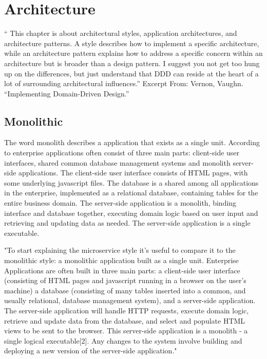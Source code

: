 \chapter{Architecture}
\label{ch:architecture}

“ This chapter is about architectural styles, application architectures, and architecture patterns. A style describes how to implement a specific architecture, while an architecture pattern explains how to address a specific concern within an architecture but is broader than a design pattern. I suggest you not get too hung up on the differences, but just understand that DDD can reside at the heart of a lot of surrounding architectural influences.”
Excerpt From: Vernon, Vaughn. “Implementing Domain-Driven Design.”


\section{Monolithic}
The word monolith describes a application that exists as a single unit. According to \citeauthor{fowler2014microservices} enterprise applications often consist of three main parts: client-side user interfaces, shared common database management systems and monolith server-side applications. The client-side user interface consists of HTML pages, with some underlying javascript files. The database is a shared among all applications in the enterprise, implemented as a relational database, containing tables for the entire business domain. The server-side application is a monolith, binding interface and database together, executing domain logic based on user input and retrieving and updating data as needed. The server-side application is a single executable.

"To start explaining the microservice style it's useful to compare it to the monolithic style: a monolithic application built as a single unit. Enterprise Applications are often built in three main parts: a client-side user interface (consisting of HTML pages and javascript running in a browser on the user's machine) a database (consisting of many tables inserted into a common, and usually relational, database management system), and a server-side application. The server-side application will handle HTTP requests, execute domain logic, retrieve and update data from the database, and select and populate HTML views to be sent to the browser. This server-side application is a monolith - a single logical executable[2]. Any changes to the system involve building and deploying a new version of the server-side application." \cite{fowler2014microservices}


